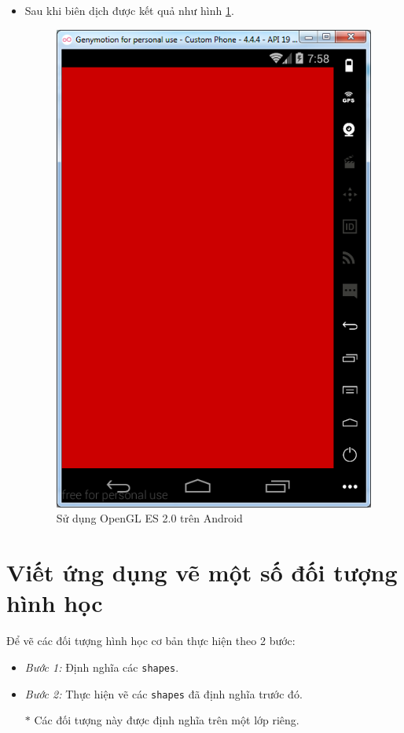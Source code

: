 \documentclass[13pt,a4paper]{extreport}
\begin{document}
\begin{itemize}
		\item Sau khi biên dịch được kết quả như hình \ref{Fig:opengles-1}.
			\begin{figure}[!h]
				\begin{center}
					\includegraphics[scale=.6]{images/opengles-1.png}
				\end{center}
				\caption{Sử dụng OpenGL ES 2.0 trên Android} \label{Fig:opengles-1}
			\end{figure}						
	\end{itemize}

\newpage	
\section{Viết ứng dụng vẽ một số đối tượng hình học}
	Để vẽ các đối tượng hình học cơ bản thực hiện theo 2 bước:
		\begin{itemize}
			\item \emph{Bước 1:} Định nghĩa các \verb|shapes|.
			
			\item \emph{Bước 2:} Thực hiện vẽ các \verb|shapes| đã định nghĩa trước đó.
			
			\item[$\ast$] Các đối tượng này được định nghĩa trên một lớp riêng.
		\end{itemize}
\end{document}
